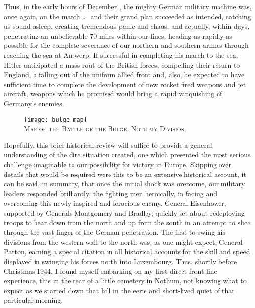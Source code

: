 \documentclass[../m3y]{subfiles}
\begin{document}
Thus, in the early hours of December , the mighty German military machine was, once again, on the march \ldots\ and their grand plan succeeded as intended, catching us sound asleep, creating tremendous panic and chaos, and actually, within days, penetrating an unbelievable 70 miles within our lines, heading as rapidly as possible for the complete severance of our northern and southern armies through reaching the sea at Antwerp. If successful in completing his march to the sea, Hitler anticipated a mass rout of the British forces, compelling their return to England, a falling out of the uniform allied front and, also, he expected to have sufficient time to complete the development of new rocket fired weapons and jet aircraft, weapons which he promised would bring a rapid vanquishing of Germany's enemies.

\begin{figure}[h]
\centering
\texttt{[image: bulge-map]}\\
\medskip
{\newtimes\textsc{Map of the Battle of the Bulge. Note my Division.}}
\end{figure}

Hopefully, this brief historical review will suffice to provide a general understanding of the dire situation created, one which presented the most serious challenge imaginable to our possibility for victory in Europe. Skipping over details that would be required were this to be an extensive historical account, it can be said, in summary, that once the initial shock was overcome, our military leaders responded brilliantly, the fighting men heroically, in facing and overcoming this newly inspired and ferocious enemy. General Eisenhower, supported by Generals Montgomery and Bradley, quickly set about redeploying troops to bear down from the north and up from the south in an attempt to slice through the vast finger of the German penetration. The first to swing his divisions from the western wall to the north was, as one might expect, General Patton, earning a special citation in all historical accounts for the skill and speed displayed in swinging his forces north into Luxembourg. Thus, shortly before Christmas 1944, I found myself embarking on my first direct front line experience, this in the rear of a little cemetery in Nothum,  not knowing what to expect as we started down that hill in the eerie and short-lived quiet of that particular morning.
\end{document}
